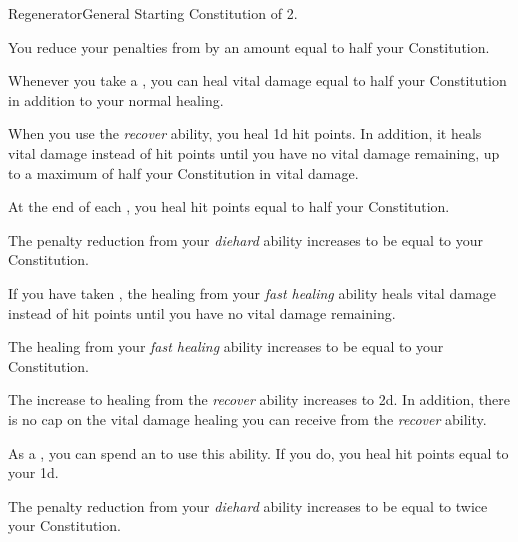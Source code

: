     \begin{feat}{Regenerator}{General}
        \featpre Starting Constitution of 2.
        \featben

         You reduce your penalties from  by an amount equal to half your Constitution.

         Whenever you take a , you can heal vital damage equal to half your Constitution in addition to your normal healing.

         When you use the \textit{recover} ability, you heal \plus1d hit points.
        In addition, it heals vital damage instead of hit points until you have no vital damage remaining, up to a maximum of half your Constitution in vital damage.

         At the end of each , you heal hit points equal to half your Constitution.

         The penalty reduction from your \textit{diehard} ability increases to be equal to your Constitution.

         If you have taken , the healing from your \textit{fast healing} ability heals vital damage instead of hit points until you have no vital damage remaining.

         The healing from your \textit{fast healing} ability increases to be equal to your Constitution.

         The increase to healing from the \textit{recover} ability increases to \plus2d.
        In addition, there is no cap on the vital damage healing you can receive from the \textit{recover} ability.

         As a , you can spend an  to use this ability.
        If you do, you heal hit points equal to your  \minus1d.

         The penalty reduction from your \textit{diehard} ability increases to be equal to twice your Constitution.
    \end{feat}

